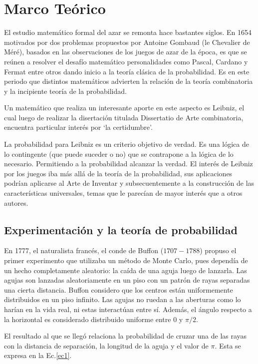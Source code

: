 \documentclass{rbf}
\begin{document}
\section{Marco Teórico}
El estudio matemático formal del azar se remonta hace bastantes siglos. En 1654 motivados por dos problemas propuestos por Antoine Gombaud (le Chevalier de Méré), basados en las observaciones de los juegos de azar de la época, es que se reúnen a resolver el desafío matemático personalidades como Pascal, Cardano y Fermat entre otros dando inicio a la teoría clásica de la probabilidad. Es en este periodo que distintos matemáticos advierten la relación de la teoría combinatoria y la incipiente teoría de la probabilidad.

Un matemático que realiza un interesante aporte en este aspecto es Leibniz, el cual luego de realizar la disertación titulada Dissertatio de Arte combinatoria, encuentra particular interés por ‘la certidumbre’.

La probabilidad para Leibniz es un criterio objetivo de verdad. Es una lógica de lo contingente (que puede suceder o no) que se contrapone a la lógica de lo necesario. Permitiendo a la probabilidad alcanzar la verdad. El interés de Leibniz por los juegos iba más allá de la teoría de la probabilidad, sus aplicaciones podrían aplicarse al Arte de Inventar y subsecuentemente a la construcción de las características universales, temas que le parecían de mayor interés que a otros autores.\cite{charles}

\subsection{Experimentación y la teoría de probabilidad}

En 1777, el naturalista francés, el conde de Buffon ($1707-1788$) propuso el primer experimento que utilizaba un método de Monte Carlo, pues dependía de un hecho completamente aleatorio: la caída de una aguja luego de lanzarla. Las agujas son lanzadas aleatoriamente en un piso con un patrón de rayas separadas una cierta distancia. Buffon considero que los centros están uniformemente distribuidos en un piso infinito. Las agujas no ruedan a las aberturas como lo harían en la vida real, ni estas interactúan entre sí. Además, el ángulo respecto a la horizontal es considerado distribuido uniforme entre 0 y $\pi/2$.

El resultado al que se llegó relaciona la probabilidad de cruzar una de las rayas con la distancia de separación, la longitud de la aguja y el valor de $\pi$. Esta se expresa en la Ec.\ref{ec1}.
\end{document}
